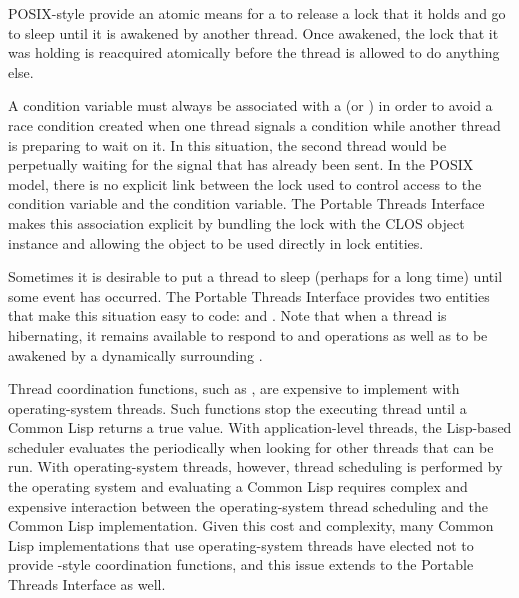 
POSIX-style  provide an atomic means for a
 to release a lock that it holds and go to sleep until it is
awakened by another thread.  Once awakened, the lock that it was holding is
reacquired atomically before the thread is allowed to do anything else.

A condition variable must always be associated with a  (or
) in order to avoid a race condition created when one
thread signals a condition while another thread is preparing to wait on it.
In this situation, the second thread would be perpetually waiting for the
signal that has already been sent.  In the POSIX model, there is no explicit
link between the lock used to control access to the condition variable and the
condition variable.  The Portable Threads Interface makes this association
explicit by bundling the lock with the \textbf{}
CLOS object instance and allowing the \textbf{}
object to be used directly in lock entities.


Sometimes it is desirable to put a thread to sleep (perhaps for a long time)
until some event has occurred.  The Portable Threads Interface provides two
entities that make this situation easy to code:
\textbf{} and \textbf{}.
Note that when a thread is hibernating, it remains available to respond to
\textbf{} and \textbf{}
operations as well as to be awakened by a dynamically surrounding
\textbf{}.


Thread coordination functions, such as , are expensive to
implement with operating-system threads.  Such functions stop the executing
thread until a Common Lisp  returns a true value.
With application-level threads, the Lisp-based scheduler evaluates the
 periodically when looking for other threads that
can be run.  With operating-system threads, however, thread scheduling is
performed by the operating system and evaluating a Common Lisp
 requires complex and expensive interaction between
the operating-system thread scheduling and the Common Lisp implementation.
Given this cost and complexity, many Common Lisp implementations that use
operating-system threads have elected not to provide -style
coordination functions, and this issue extends to the Portable Threads
Interface as well.

